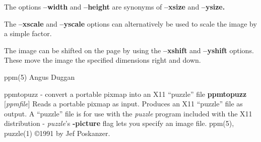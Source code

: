 The options
{\bf --width}
and
{\bf --height}
are synonyms of
{\bf --xsize}
and
{\bf --ysize.}

The
{\bf --xscale}
and
{\bf --yscale}
options can alternatively be used to scale the image by a simple factor.

\par
The image can be shifted on the page by using the
{\bf --xshift}
and
{\bf --yshift}
options. These move the image the specified dimensions right and down.

ppm(5)
Angus Duggan
%
 
%

\newpage
%

ppmtopuzz - convert a portable pixmap into an X11 ``puzzle'' file
{\bf ppmtopuzz}
{\rm [}{\it ppmfile}{\rm ]}
Reads a portable pixmap as input.
Produces an X11 ``puzzle'' file as output.
A ``puzzle'' file is for use with the
{\it puzzle}
program included with the X11 distribution -
{\it puzzle}{\rm 's}
{\bf -picture}
flag lets you specify an image file.
ppm(5), puzzle(1)
\copyright 1991 by Jef Poskanzer.
%
 
%

